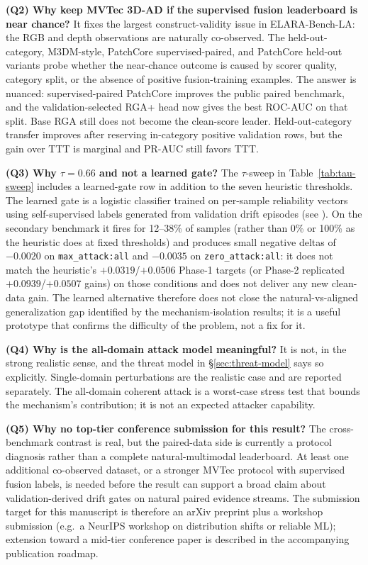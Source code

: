 \documentclass[10pt,conference]{IEEEtran}
\newcommand{\method}{RGA}
\newcommand{\methodplus}{RGA+}
\newcommand{\benchmark}{ELARA-Bench-LA}
\begin{document}
\noindent\textbf{(Q2) Why keep MVTec 3D-AD if the supervised fusion leaderboard
is near chance?} It fixes the largest construct-validity issue in
\benchmark{}: the RGB and depth observations are naturally co-observed. The
held-out-category, M3DM-style, PatchCore supervised-paired, and PatchCore
held-out variants probe whether the near-chance outcome is caused by scorer
quality, category split, or the absence of positive fusion-training examples.
The answer is nuanced: supervised-paired PatchCore improves the public paired
benchmark, and the validation-selected \methodplus{} head now gives the best
ROC-AUC on that split. Base \method{} still does not become the clean-score
leader. Held-out-category transfer improves after reserving in-category
positive validation rows, but the gain over TTT is marginal and PR-AUC still
favors TTT.

\noindent\textbf{(Q3) Why $\tau=0.66$ and not a learned gate?} The
$\tau$-sweep in Table~\ref{tab:tau-sweep} includes a learned-gate row in
addition to the seven heuristic thresholds. The learned gate is a
logistic classifier trained on per-sample reliability vectors using
self-supervised labels generated from validation drift episodes (see
). On the secondary
benchmark it fires for 12--38\% of samples (rather than 0\% or 100\% as
the heuristic does at fixed thresholds) and produces small negative
deltas of $-0.0020$ on \texttt{max\_attack:all} and $-0.0035$ on
\texttt{zero\_attack:all}: it does not match the heuristic's
$+0.0319$/$+0.0506$ Phase-1 targets (or Phase-2 replicated $+0.0939$/$+0.0507$ gains) on those conditions and does not deliver any
new clean-data gain. The learned alternative therefore does not close
the natural-vs-aligned generalization gap identified by the
mechanism-isolation results; it is a useful prototype that confirms
the difficulty of the problem, not a fix for it.

\noindent\textbf{(Q4) Why is the all-domain attack model meaningful?} It
is not, in the strong realistic sense, and the threat model in
§\ref{sec:threat-model} says so explicitly. Single-domain perturbations
are the realistic case and are reported separately. The all-domain
coherent attack is a worst-case stress test that bounds the mechanism's
contribution; it is not an expected attacker capability.

\noindent\textbf{(Q5) Why no top-tier conference submission for this
result?} The cross-benchmark contrast is real, but the paired-data side is
currently a protocol diagnosis rather than a complete natural-multimodal
leaderboard. At least one additional co-observed dataset, or a stronger
MVTec protocol with supervised fusion labels, is needed before the result can
support a broad claim about validation-derived drift gates on natural paired
evidence streams. The submission target for this manuscript is therefore an
arXiv preprint plus a workshop submission (e.g.~a NeurIPS workshop on
distribution shifts or reliable ML); extension toward a mid-tier conference
paper is described in the accompanying publication roadmap.
\end{document}
